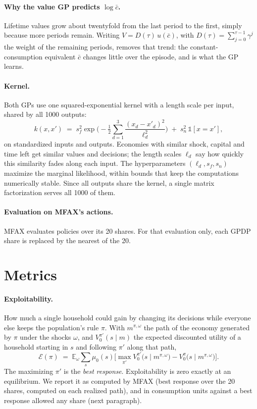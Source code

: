 \documentclass[11pt,a4paper]{article}
\begin{document}
\paragraph{Why the value GP predicts $\log \bar c$.} Lifetime values grow about twentyfold from the
last period to the first, simply because more periods remain. Writing $V = D(\tau)\,u(\bar c)$, with
$D(\tau) = \sum_{j=0}^{\tau-1}\gamma^j$ the weight of the remaining periods, removes that trend: the
constant-consumption equivalent $\bar c$ changes little over the episode, and is what the GP learns.

\paragraph{Kernel.} Both GPs use one squared-exponential kernel with a length scale per input,
shared by all 1000 outputs:
\[
k(x, x') \;=\; s_f^2 \exp\Big(-\tfrac12 \sum_{d=1}^{3} \frac{(x_d - x'_d)^2}{\ell_d^2}\Big)
\;+\; s_n^2\, \mathbb 1[x = x'] ,
\]
on standardized inputs and outputs. Economies with similar shock, capital and time left get similar
values and decisions; the length scales $\ell_d$ say how quickly this similarity fades along each
input. The hyperparameters $(\ell_d, s_f, s_n)$ maximize the marginal likelihood, within bounds that
keep the computations numerically stable. Since all outputs share the kernel, a single matrix
factorization serves all 1000 of them.

\paragraph{Evaluation on MFAX's actions.} MFAX evaluates policies over its 20 shares. For that
evaluation only, each GPDP share is replaced by the nearest of the 20.

\section{Metrics}\label{sec:metrics}

\paragraph{Exploitability.} How much a single household could gain by changing its decisions while
everyone else keeps the population's rule $\pi$. With $m^{\pi,\omega}$ the path of the economy
generated by $\pi$ under the shocks $\omega$, and $V^{\pi'}_0(s\mid m)$ the expected discounted
utility of a household starting in $s$ and following $\pi'$ along that path,
\[
\mathcal E(\pi) \;=\; \mathbb E_\omega \sum_{s} \mu_0(s)\Big[\max_{\pi'} V^{\pi'}_0\big(s\mid m^{\pi,\omega}\big)
- V^{\pi}_0\big(s\mid m^{\pi,\omega}\big)\Big].
\]
The maximizing $\pi'$ is the \emph{best response}. Exploitability is zero exactly at an equilibrium.
We report it as computed by MFAX (best response over the 20 shares, computed on each realized path),
and in consumption units against a best response allowed any share (next paragraph).
\end{document}
